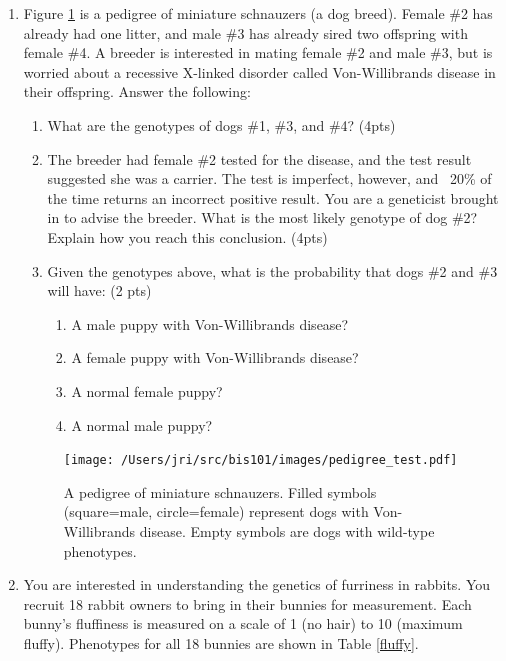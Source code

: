 \documentclass[]{article}
\begin{document}
\begin{enumerate}

\item Figure \ref{dogigree} is a pedigree of miniature schnauzers (a dog breed). Female \#2 has already had one litter, and male \#3 has already sired two offspring with female \#4. A breeder is interested in mating female \#2 and male \#3, but is worried about a recessive X-linked disorder called Von-Willibrands disease in their offspring. Answer the following:

\begin{enumerate}
\item What are the genotypes of dogs \#1, \#3, and \#4? (4pts)
\item The breeder had female \#2 tested for the disease, and the test result suggested she was a carrier. The test is imperfect, however, and ~20\% of the time returns an incorrect positive result. You are a geneticist brought in to advise the breeder. What is the most likely genotype of dog \#2? Explain how you reach this conclusion. (4pts)
\item Given the genotypes above, what is the probability that dogs \#2 and \#3 will have: (2 pts)
\begin{enumerate}
\item A male puppy with Von-Willibrands disease?
\item A female puppy with Von-Willibrands disease?
\item A normal female puppy?
\item A normal male puppy?
\end{enumerate}
\end{enumerate}

\begin{figure}[h]
  \begin{center}
   \texttt{[image: /Users/jri/src/bis101/images/pedigree\_test.pdf]}
\caption{A pedigree of miniature schnauzers. Filled symbols (square=male, circle=female) represent dogs with Von-Willibrands disease. Empty symbols are dogs with wild-type phenotypes.}
\label{dogigree}
  \end{center}
\end{figure}

\newpage

\item You are interested in understanding the genetics of furriness in rabbits. You recruit 18 rabbit owners to bring in their bunnies for measurement.  Each bunny's fluffiness is measured on a scale of 1 (no hair) to 10 (maximum fluffy). Phenotypes for all 18 bunnies are shown in Table \ref{fluffy}. 


\end{enumerate}
\end{document}
